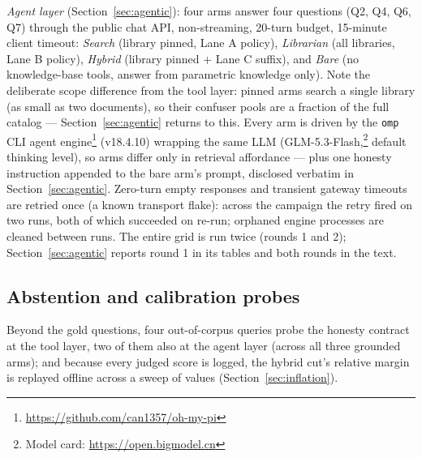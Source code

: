 \emph{Agent layer} (Section~\ref{sec:agentic}): four arms answer four
questions (Q2, Q4, Q6, Q7) through the public chat API, non-streaming,
20-turn budget, 15-minute client timeout: \emph{Search} (library pinned,
Lane A policy), \emph{Librarian} (all libraries, Lane B policy),
\emph{Hybrid} (library pinned + Lane C suffix), and \emph{Bare} (no
knowledge-base tools, answer from parametric knowledge only). Note the
deliberate scope difference from the tool layer: pinned arms search a
single library (as small as two documents), so their confuser pools are a
fraction of the full catalog --- Section~\ref{sec:agentic} returns to this.
Every arm is
driven by the \texttt{omp} CLI agent engine\footnote{\url{https://github.com/can1357/oh-my-pi}}
(v18.4.10) wrapping the same
LLM (GLM-5.3-Flash,\footnote{Model card:
\url{https://open.bigmodel.cn}} default thinking level), so arms differ
only in retrieval affordance --- plus one honesty instruction appended to
the bare arm's prompt, disclosed verbatim in
Section~\ref{sec:agentic}. Zero-turn empty responses and transient
gateway timeouts are retried once (a known transport flake): across the
campaign the retry fired on two runs, both of which succeeded on re-run;
orphaned engine processes are cleaned between runs. The entire grid is run
twice (rounds 1 and 2); Section~\ref{sec:agentic} reports round 1 in its
tables and both rounds in the text.

\subsection{Abstention and calibration probes}
Beyond the gold questions, four out-of-corpus queries probe the honesty
contract at the tool layer, two of them also at the agent layer (across
all three grounded arms); and because every judged score is logged, the hybrid cut's relative margin is replayed offline across a
sweep of values (Section~\ref{sec:inflation}).

